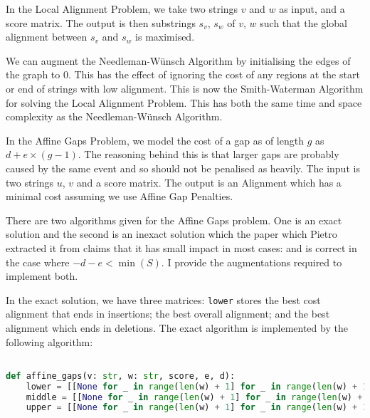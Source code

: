 \documentclass[10pt,\jkfside,a4paper]{article}
\begin{document}
\begin{enumerate}
    \begin{definition}

        In the Local Alignment Problem, we take two strings $v$ and $w$ as input, and a score matrix. The output is then substrings $s_v$, $s_w$ of $v$, $w$ such that the global alignment between $s_v$ and $s_w$
        is maximised.

    \end{definition}

    We can augment the Needleman-W\"unsch Algorithm by initialising the edges of the graph to $0$. This has the effect of ignoring the cost of any regions at the start or end of strings with low alignment. This is
    now the Smith-Waterman Algorithm for solving the Local Alignment Problem. This has both the same time and space complexity as the Needleman-W\"unsch Algorithm.

    \begin{definition}

        In the Affine Gaps Problem, we model the cost of a gap as of length $g$ as $d + e \times (g - 1)$. The reasoning behind this is that larger gaps are probably caused by the same event and so should not be
        penalised as heavily. The input is two strings $u$, $v$ and a score matrix. The output is an Alignment which has a minimal cost assuming we use Affine Gap Penalties.

    \end{definition}

    There are two algorithms given for the Affine Gaps problem. One is an exact solution and the second is an inexact solution which the paper which Pietro extracted it from claims that it has small impact in
    most cases: and is correct in the case where $-d - e < \min(S)$. I provide the augmentations required to implement both.

    In the exact solution, we have three matrices: \texttt{lower} stores the best cost alignment that ends in insertions; the best overall alignment; and the best alignment which ends in deletions. The exact
    algorithm is implemented by the following algorithm:

    \begin{lstlisting}[language=python]

def affine_gaps(v: str, w: str, score, e, d):
    lower = [[None for _ in range(len(w) + 1] for _ in range(len(w) + 1)]
    middle = [[None for _ in range(len(w) + 1] for _ in range(len(w) + 1)]
    upper = [[None for _ in range(len(w) + 1] for _ in range(len(w) + 1)]


\end{lstlisting}
\end{enumerate}
\end{document}
